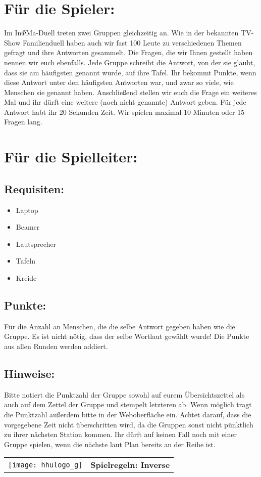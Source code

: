 \documentclass[a4paper,10pt]{article}
\def\spiele{Inverse}
\newcommand{\unten}{
 Bitte notiert die Punktzahl der Gruppe sowohl auf eurem Übersichtszettel als auch auf dem Zettel der Gruppe und stempelt letzteren ab. Wenn möglich tragt die Punktzahl außerdem bitte in der Weboberfläche ein.
 Achtet darauf, dass die vorgegebene Zeit nicht überschritten wird, da die Gruppen sonst nicht pünktlich zu ihrer nächsten Station kommen. Ihr dürft auf keinen Fall noch mit einer Gruppe spielen, wenn die nächste laut Plan bereits an der Reihe ist.
}
\begin{document}
\section*{Für die Spieler:}
Im In$\Phi$Ma-Duell treten zwei Gruppen gleichzeitig an. Wie in der bekannten TV-Show Familienduell haben auch wir fast 100 Leute zu verschiedenen Themen gefragt und ihre Antworten gesammelt. Die Fragen, die wir Ihnen gestellt haben nennen wir euch ebenfalls. Jede Gruppe schreibt die Antwort, von der sie glaubt, dass sie am häufigsten genannt wurde, auf ihre Tafel. Ihr bekommt Punkte, wenn diese Antwort unter den häufigsten Antworten war, und zwar so viele, wie Menschen sie genannt haben. Anschließend stellen wir euch die Frage ein weiteres Mal und ihr dürft eine weitere (noch nicht genannte) Antwort geben. Für jede Antwort habt ihr 20 Sekunden Zeit. Wir spielen maximal 10 Minuten oder 15 Fragen lang.

\section*{Für die Spielleiter:}
\subsection*{Requisiten:} 
\begin{itemize}
 \item Laptop
 \item Beamer
 \item Lautsprecher
 \item Tafeln
 \item Kreide
\end{itemize}

\subsection*{Punkte:}
Für die Anzahl an Menschen, die die selbe Antwort gegeben haben wie die Gruppe. Es ist nicht nötig, dass der selbe Wortlaut gewählt wurde! Die Punkte aus allen Runden werden addiert. 

\subsection*{Hinweise:}
\unten

\newpage


  \begin{tabularx}{\textwidth}{lc}
    \texttt{[image: hhulogo\_g]}
  & {\Huge \textbf{Spielregeln: \spiele}}
  \end{tabularx}\\
\end{document}
